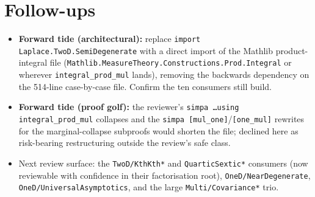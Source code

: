 \documentclass[11pt]{article}
\begin{document}
\section{Follow-ups}
\begin{itemize}[noitemsep]
  \item \textbf{Forward tide (architectural):} replace \texttt{import Laplace.TwoD.SemiDegenerate}
    with a direct import of the Mathlib product-integral file
    (\texttt{Mathlib.MeasureTheory.Constructions.Prod.Integral} or wherever
    \texttt{integral\_prod\_mul} lands), removing the backwards dependency on the 514-line
    case-by-case file. Confirm the ten consumers still build.
  \item \textbf{Forward tide (proof golf):} the reviewer's \texttt{simpa \dots using
    integral\_prod\_mul} collapses and the \texttt{simpa [mul\_one]}/\texttt{[one\_mul]}
    rewrites for the marginal-collapse subproofs would shorten the file; declined here as
    risk-bearing restructuring outside the review's safe class.
  \item Next review surface: the \texttt{TwoD/KthKth*} and \texttt{QuarticSextic*} consumers
    (now reviewable with confidence in their factorisation root), \texttt{OneD/NearDegenerate},
    \texttt{OneD/UniversalAsymptotics}, and the large \texttt{Multi/Covariance*} trio.
\end{itemize}
\end{document}
